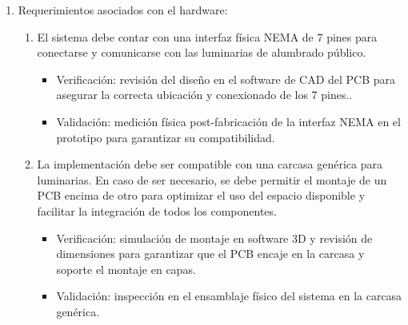 \documentclass[
11pt, %
]{charter}
\begin{document}
\begin{enumerate}
	\item Requerimientos asociados con el hardware:
		\begin{enumerate}
			\item El sistema debe contar con una interfaz física NEMA de 7 pines para conectarse y comunicarse con las luminarias de alumbrado público.
				  \begin{itemize}
				\item Verificación: revisión del diseño en el software de CAD del PCB para asegurar la correcta ubicación y conexionado de los 7 pines..
				\item Validación:  medición física post-fabricación de la interfaz NEMA en el prototipo para garantizar su compatibilidad.
				\end{itemize}
			\item La implementación debe ser compatible con una carcasa genérica para luminarias. En caso de ser necesario, se debe permitir el montaje de un PCB encima de otro para optimizar el uso del espacio disponible y facilitar la integración de todos los componentes.
				\begin{itemize}
				\item Verificación: simulación de montaje en software 3D y revisión de dimensiones para garantizar que el PCB encaje en la carcasa y 	soporte el montaje en capas.
				\item Validación: inspección en el ensamblaje físico del sistema en la carcasa genérica.
				\end{itemize}


\end{enumerate}
\end{enumerate}
\end{document}
